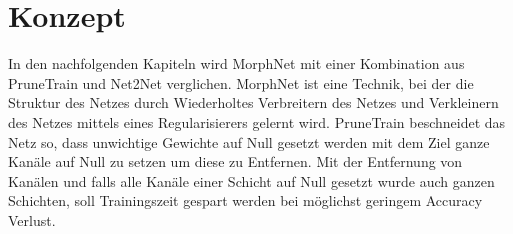 \begin{figure}
     \centering
     \caption{}
     \label{abb:BaseAccS}
\end{figure}


\color{black}

\section{Konzept}\label{sec:konzept}
In den nachfolgenden Kapiteln wird MorphNet mit einer Kombination aus PruneTrain und Net2Net verglichen. MorphNet ist eine Technik, bei der die Struktur des Netzes durch Wiederholtes Verbreitern des Netzes und Verkleinern des Netzes mittels eines Regularisierers gelernt wird.
PruneTrain beschneidet das Netz so, dass unwichtige Gewichte auf Null gesetzt werden mit dem Ziel ganze Kanäle auf Null zu setzen um diese zu Entfernen. Mit der Entfernung von Kanälen und falls alle Kanäle einer Schicht auf Null gesetzt wurde auch ganzen Schichten, soll Trainingszeit gespart werden bei möglichst geringem Accuracy Verlust.



